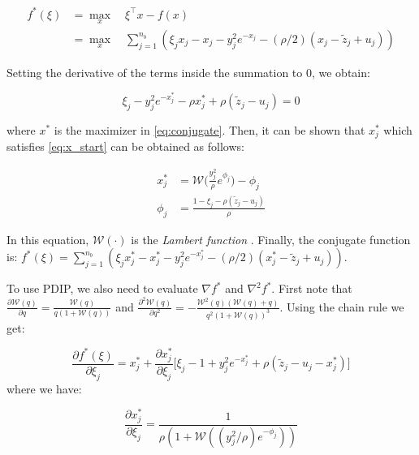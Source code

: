 \documentclass{article}
\begin{document}
\begin{align}
f^*(\xi) & = \max_x \quad \xi^\top x - f(x)\\
& =  \max_x \quad \sum_{j=1}^{n_b} (\xi_jx_j - x_j - y_j^2e^{-x_j} - (\rho/2)(x_j-\tilde{z}_j+u_j))
\label{eq:conjugate}
\end{align}

Setting the derivative of the terms inside the summation to 0, we obtain:

\begin{equation}
\xi_j-y_j^2e^{-x_j^*}-\rho x_j^* + \rho (\tilde{z}_j-u_j)=0
\label{eq:x_start}
\end{equation}

\noindent where $x^*$ is the maximizer in \ref{eq:conjugate}. Then, it can be shown that $x_j^*$ which satisfies \eqref{eq:x_start} can be obtained as follows:

\begin{align}
x^*_j & = \mathscr{W}\bigg(\frac{y_j^2}{\rho} e^{\phi_j} \bigg) - \phi_j \\
\phi_j & =\frac{1-\xi_j-\rho(\tilde{z}_j-u_j)}{\rho}
\end{align}

In this equation, $\mathscr{W}(\cdot)$ is the \textit{Lambert function} \cite{corless_lambertw_1996}. Finally, the conjugate function is: $f^*(\xi) = \sum_{j=1}^{n_b} (\xi_jx^*_j - x^*_j - y_j^2e^{-x^*_j} - (\rho/2)(x^*_j-\tilde{z}_j+u_j))$.

To use PDIP, we also need to evaluate $\nabla f^*$ and $\nabla^2 f^*$. First note that $\frac{\partial \mathscr{W}(q)}{\partial q} = \frac{\mathscr{W}(q)}{q(1+\mathscr{W}(q))}$ and $\frac{\partial^2 \mathscr{W}(q)}{\partial q^2} = - \frac{\mathscr{W}^2(q)(\mathscr{W}(q)+q)}{q^2(1+\mathscr{W}(q))^3}$. Using the chain rule we get:


\begin{equation}
\frac{\partial f^*(\xi)}{\partial \xi_j}  =  x^*_j  + \frac{\partial x^*_j}{\partial \xi_j} \bigg[ \xi_j -1 + y_j^2 e^{-x_j^*} + \rho (\tilde{z}_j - u_j - x_j^*) \bigg]
\label{eq:d_f*_start}
\end{equation}
where we have:

\begin{equation}
\frac{\partial x_j^*}{\partial \xi_j}  = \frac{1}{\rho(1+\mathscr{W}((y_j^2/\rho) e^{-\phi_j} ))}
\label{eq:d_x*_start}
\end{equation}
\end{document}
